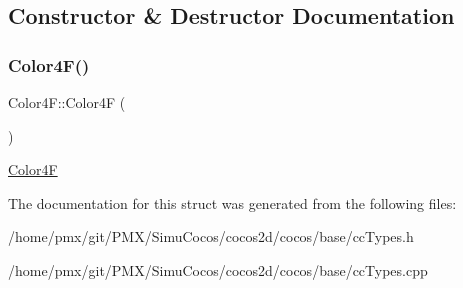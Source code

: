 \subsection{Constructor \& Destructor Documentation}
\mbox{\label{structColor4F_a63f4f3b495f4a60f691b80d794936e1b}} 
\subsubsection{\texorpdfstring{Color4\+F()}{Color4F()}}
{\footnotesize\ttfamily Color4\+F\+::\+Color4F (\begin{DoxyParamCaption}{ }\end{DoxyParamCaption})}

\hyperlink{structColor4F}{Color4F} 

The documentation for this struct was generated from the following files\+:\begin{DoxyCompactItemize}
\item 
/home/pmx/git/\+P\+M\+X/\+Simu\+Cocos/cocos2d/cocos/base/cc\+Types.\+h\item 
/home/pmx/git/\+P\+M\+X/\+Simu\+Cocos/cocos2d/cocos/base/cc\+Types.\+cpp\end{DoxyCompactItemize}
